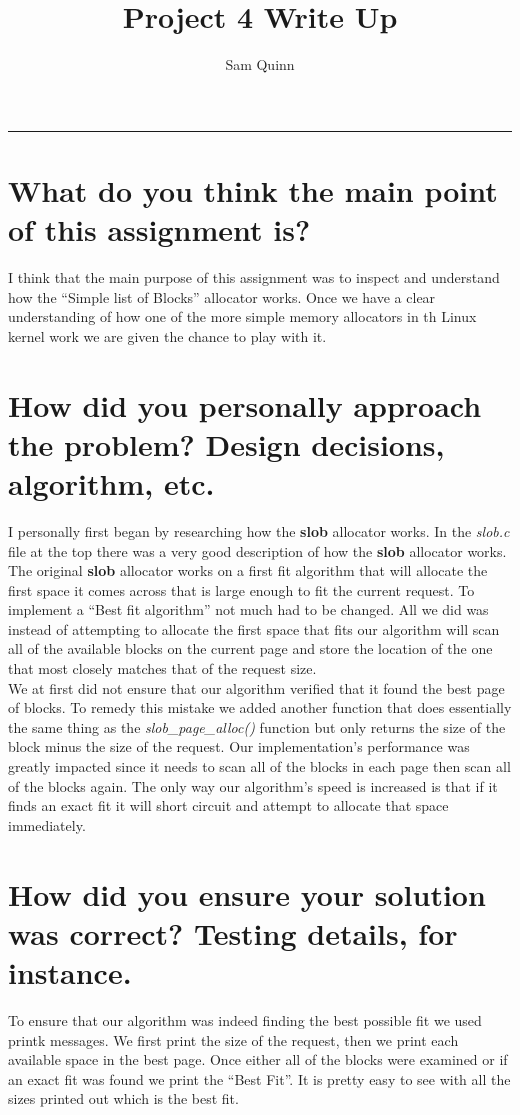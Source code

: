 \documentclass[letterpaper,10pt,notitlepage,fleqn]{article}
\title{Project 4 Write Up}
\author{Sam Quinn}
\begin{document}
\maketitle
\hrule

\section*{What do you think the main point of this assignment is?}
    I think that the main purpose of this assignment was to inspect and understand 
    how the ``Simple list of Blocks'' allocator works. Once we have a clear 
    understanding of how one of the more simple memory allocators in th Linux kernel 
    work we are given the chance to play with it. 
\section*{How did you personally approach the problem? Design decisions, algorithm, etc.}
    I personally first began by researching how the \textbf{slob} allocator works. In the 
    \textit{slob.c} file at the top there was a very good description of how the 
    \textbf{slob} allocator works. The original \textbf{slob} allocator works on a first fit algorithm 
    that will allocate the first space it comes across that is large enough to fit 
    the current request. To implement a ``Best fit algorithm'' not much had to be 
    changed. All we did was instead of attempting to allocate the first space that 
    fits our algorithm will scan all of the available blocks on the current page 
    and store the location of the one that most closely matches that of the request 
    size. \\
    We at first did not ensure that our algorithm verified that it found the 
    best page of blocks. To remedy this mistake we added another function that does 
    essentially the same thing as the \textit{slob\_page\_alloc()} function but 
    only returns the size of the block minus the size of the request. Our implementation's 
    performance was greatly impacted since it needs to scan all of the blocks in 
    each page then scan all of the blocks again. The only way our algorithm's speed 
    is increased is that if it finds an exact fit it will short circuit and attempt 
    to allocate that space immediately.

\section*{How did you ensure your solution was correct? Testing details, for instance.}
    To ensure that our algorithm was indeed finding the best possible fit we used 
    printk messages. We first print the size of the request, then we print each 
    available space in the best page. Once either all of the blocks were examined 
    or if an exact fit was found we print the ``Best Fit''. It is pretty easy to 
    see with all the sizes printed out which is the best fit.
\end{document}
